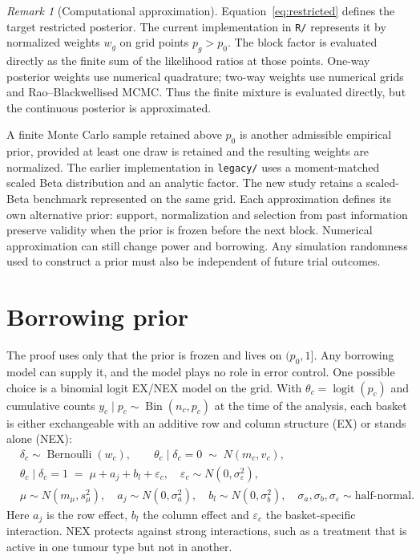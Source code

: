 \documentclass[11pt,a4paper]{article}
\theoremstyle{definition}
\theoremstyle{remark}
\newtheorem{remark}{Remark}
\DeclareMathOperator{\logit}{logit}
\DeclareMathOperator{\Bin}{Bin}
\DeclareMathOperator{\Bern}{Bernoulli}
\begin{document}
\begin{remark}[Computational approximation]
Equation~\ref{eq:restricted} defines the target restricted posterior.
The current implementation in \texttt{R/} represents it by normalized weights
$w_g$ on grid points $p_g>p_0$. The block factor is evaluated directly as the
finite sum of the likelihood ratios at those points. One-way posterior
weights use numerical quadrature; two-way weights use numerical grids and
Rao--Blackwellised MCMC. Thus the finite mixture is evaluated directly, but
the continuous posterior is approximated.

A finite Monte Carlo sample retained above $p_0$ is another admissible
empirical prior, provided at least one draw is retained and the resulting
weights are normalized. The earlier implementation in \texttt{legacy/}
uses a moment-matched scaled Beta distribution and an analytic factor.
The new study retains a scaled-Beta benchmark represented on the same grid.
Each approximation defines its own alternative prior: support, normalization
and selection from past information preserve validity when the prior is
frozen before the next block. Numerical approximation can still change
power and borrowing. Any simulation randomness used to construct a prior
must also be independent of future trial outcomes.
\end{remark}

\section{Borrowing prior}\label{sec:model}

The proof uses only that the prior is frozen and lives on $(p_0,1]$.
Any borrowing model can supply it, and the model plays no role in error control.
One possible choice is a binomial logit EX/NEX model on the grid.
With $\theta_c = \logit(p_c)$ and cumulative counts $y_c \mid p_c \sim \Bin(n_c, p_c)$ at the time of the analysis, each basket is either exchangeable with an additive row and column structure (EX) or stands alone (NEX):
\begin{equation}\label{eq:exnex}
\begin{aligned}
  &\delta_c \sim \Bern(w_c), \qquad \theta_c \mid \delta_c = 0 \;\sim\; N(m_c, v_c), \\
  &\theta_c \mid \delta_c = 1 \;=\; \mu + a_j + b_l + \varepsilon_c, \quad \varepsilon_c \sim N(0, \sigma_\varepsilon^2), \\
  &\mu \sim N(m_\mu, s_\mu^2), \quad a_j \sim N(0, \sigma_a^2), \quad b_l \sim N(0, \sigma_b^2), \quad
  \sigma_a, \sigma_b, \sigma_\varepsilon \sim \text{half-normal}.
\end{aligned}
\end{equation}
Here $a_j$ is the row effect, $b_l$ the column effect and $\varepsilon_c$ the basket-specific interaction.
NEX protects against strong interactions, such as a treatment that is active in one tumour type but not in another.
\end{document}
